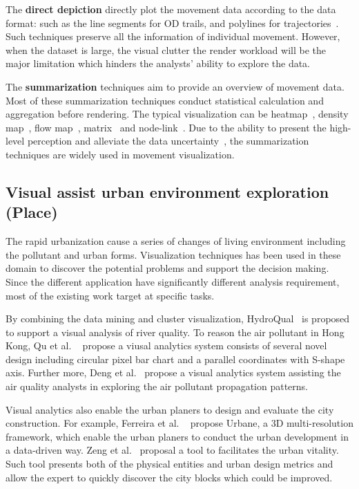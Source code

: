 The \textbf{direct depiction} directly plot the movement data according to the data format: such as the line segments for OD trails, and polylines for trajectories~\cite{andrienko2013visual, ferreira2013visual, kruger2013trajectorylenses}. Such techniques preserve all the information of individual movement. However, when the dataset is large, the visual clutter the render workload will be the major limitation which hinders the analysts’ ability to explore the data.

The \textbf{summarization} techniques aim to provide an overview of movement data. Most of these summarization techniques conduct statistical calculation and aggregation before rendering. The typical visualization can be heatmap~\cite{wilkinson2009history}, density map~\cite{lanir2014visualizing}, flow map~\cite{guo2014origin}, matrix~\cite{wood2010visualisation} and node-link~\cite{von2016mobilitygraphs}. Due to the ability to present the high-level perception and alleviate the data uncertainty~\cite{andrienko2013visual}, the summarization techniques are widely used in movement visualization. 

\subsection{Visual assist urban environment exploration (Place)}
The rapid urbanization cause a series of changes of living environment including the pollutant and urban forms. Visualization techniques has been used in these domain to discover the potential problems and support the decision making. Since the different application have significantly different analysis requirement, most of the existing work target at specific tasks.  

By combining the data mining and cluster visualization, HydroQual~\cite{accorsi2014hydroqual} is proposed to support a visual analysis of river quality. 
To reason the air pollutant in Hong Kong, Qu et al. ~\cite{qu2007visual} propose a viusal analytics system consists of several novel design including  circular pixel bar chart and a parallel coordinates with S-shape axis.  Further more, Deng et al.~\cite{deng2019airvis} propose a visual analytics system assisting the air quality analysts in exploring the air pollutant propagation patterns. 

Visual analytics also enable the urban planers to design and evaluate the city construction. For example, Ferreira et al. ~\cite{ferreira2015urbane} propose Urbane, a 3D multi-resolution framework, which enable the urban planers to conduct the urban development in a data-driven way. Zeng et al.~\cite{zeng2018vitalvizor} proposal a tool to facilitates the urban vitality. Such tool presents both of the physical entities and urban design metrics and allow the expert to quickly discover the city blocks which could be improved.
